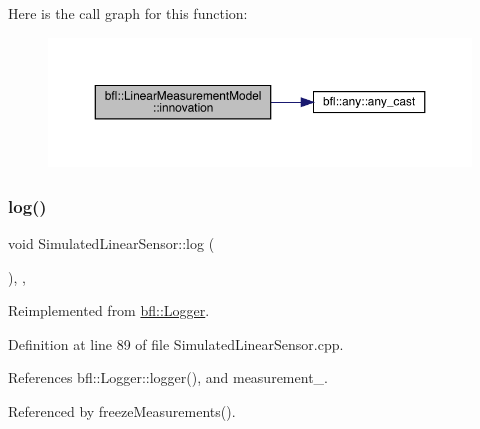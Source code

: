 Here is the call graph for this function\+:
\nopagebreak
\begin{figure}[H]
\begin{center}
\leavevmode
\includegraphics[width=350pt]{classbfl_1_1LinearMeasurementModel_a12485b4b6d511e97e338a4db6861b277_cgraph}
\end{center}
\end{figure}
\mbox{\label{classbfl_1_1SimulatedLinearSensor_ab75bbe744d8516c97dfc90ad499b10e6}} 
\subsubsection{\texorpdfstring{log()}{log()}}
{\footnotesize\ttfamily void Simulated\+Linear\+Sensor\+::log (\begin{DoxyParamCaption}{ }\end{DoxyParamCaption})\hspace{0.3cm}{\ttfamily [override]}, {\ttfamily [protected]}, {\ttfamily [virtual]}}



Reimplemented from \mbox{\hyperlink{classbfl_1_1Logger_ad44f46593cb8c4c87c1178eb326e2f64}{bfl\+::\+Logger}}.



Definition at line 89 of file Simulated\+Linear\+Sensor.\+cpp.



References bfl\+::\+Logger\+::logger(), and measurement\+\_\+.



Referenced by freeze\+Measurements().

